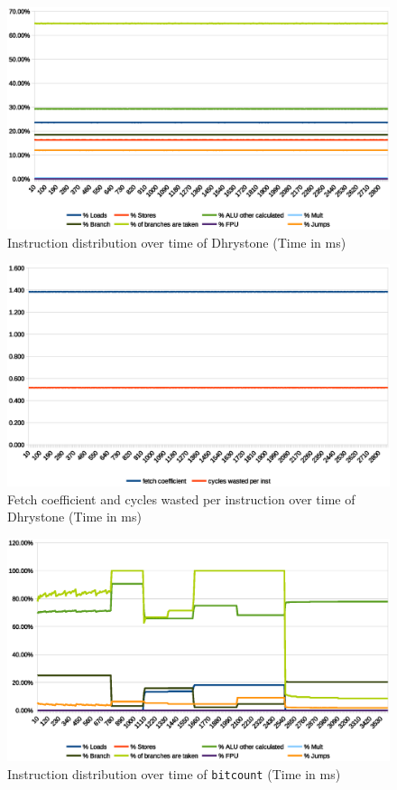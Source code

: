 \documentclass[../bachelor_paper.tex]{subfiles}
\begin{document}
\begin{figure}
    \centering
    \includegraphics[width=\textwidth]{img/graph/riscv/dhrystone_inst.eps}
    \caption{Instruction distribution over time of Dhrystone (Time in ms)}
    \label{fig:res/dhrystone/inst}
\end{figure}

\begin{figure}
    \centering
    \includegraphics[width=\textwidth]{img/graph/riscv/dhrystone_fetch_waste.eps}
    \caption{Fetch coefficient and cycles wasted per instruction over time of Dhrystone (Time in ms)}
    \label{fig:res/dhrystone/fetch_waste}
\end{figure}

\begin{figure}
    \centering
    \includegraphics[width=\textwidth]{img/graph/mibench/bitcount_inst.eps}
    \caption{Instruction distribution over time of \texttt{bitcount} (Time in ms)}
    \label{fig:res/bitcount/inst}
\end{figure}
\end{document}
